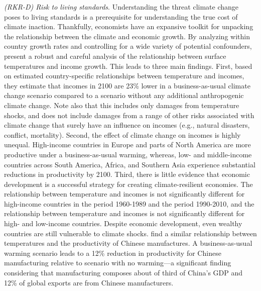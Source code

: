 \textit{(RKR-D) Risk to living standards}. Understanding the threat climate change poses to living standards is a prerequisite for understanding the true cost of climate inaction. Thankfully, economists have an expansive toolkit for unpacking the relationship between the climate and economic growth. By analyzing within country growth rates and controlling for a wide variety of potential confounders, \cite{burke2015global} present a robust and careful analysis of the relationship between surface temperatures and income growth. This leads to three main findings. First, based on estimated country-specific relationships between temperature and incomes, they estimate that incomes in 2100 are 23\% lower in a business-as-usual climate change scenario compared to a scenario without any additional anthropogenic climate change. Note also that this includes only damages from temperature shocks, and does not include damages from a range of other risks associated with climate change that surely have an influence on incomes (e.g., natural disasters, conflict, mortality). Second, the effect of climate change on incomes is highly unequal. High-income countries in Europe and parts of North America are more productive under a business-as-usual warming, whereas, low- and middle-income countries across South America, Africa, and Southern Asia experience substantial reductions in productivity by 2100. Third, there is little evidence that economic development is a successful strategy for creating climate-resilient economies. The relationship between temperature and incomes is not significantly different for high-income countries in the period 1960-1989 and the period 1990-2010, and the relationship between temperature and incomes is not significantly different for high- and low-income countries. Despite economic development, even wealthy countries are still vulnerable to climate shocks. \cite{zhang2018temperature} find a similar relationship between temperatures and the productivity of Chinese manufactures. A business-as-usual warming scenario leads to a 12\% reduction in productivity for Chinese manufacturing relative to scenario with no warming---a significant finding considering that manufacturing composes about of third of China's GDP and 12\% of global exports are from Chinese manufacturers.

